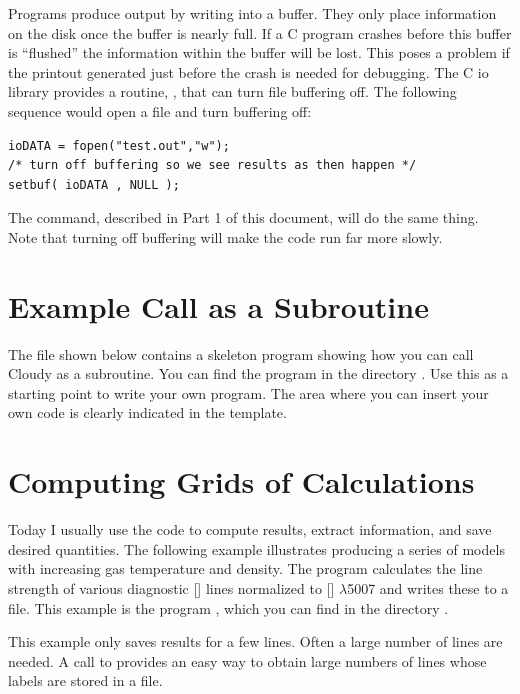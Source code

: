 Programs produce output by writing into a buffer.
They only place
information on the disk once the buffer is nearly full.
If a C program
crashes before this buffer is ``flushed'' the information within the buffer
will be lost.
This poses a problem if the printout generated just before
the crash is needed for debugging.
The C io library provides a routine,
, that can turn file buffering off.
The following sequence would
open a file and turn buffering off:
\begin{verbatim}
ioDATA = fopen("test.out","w");
/* turn off buffering so we see results as then happen */
setbuf( ioDATA , NULL );
\end{verbatim}

The  command, described in Part 1 of this document, will do the same thing.
Note that turning off buffering will make the code run far more slowly.

\section{Example Call as a Subroutine}

The file  shown below contains a skeleton program
showing how you can call Cloudy as a subroutine. You can find the program in
the directory . Use this as a starting point to
write your own program. The area where you can insert your own code is clearly
indicated in the template.
{ \setverbatimfontsize{\tiny}
}

\section{Computing Grids of Calculations}

Today I usually use the code to compute results, extract information, and save
desired quantities. The following example illustrates producing a series of
models with increasing gas temperature and density. The program calculates the
line strength of various diagnostic [\oiii] lines normalized to [\oiii]
$\lambda $5007 and writes these to a file. This example is the program
, which you can find in the directory
.

This example only saves results for a few lines. Often a large number of
lines are needed. A call to  provides an easy way to
obtain large numbers of lines whose labels are stored in a file.
{ \setverbatimfontsize{\tiny}
}
